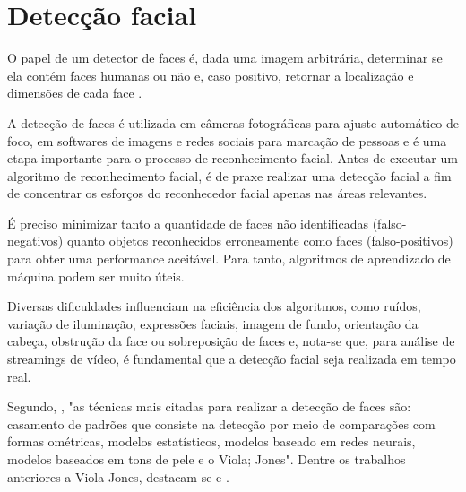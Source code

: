 \chapter{Detecção facial}

O papel de um detector de faces é, dada uma imagem arbitrária, determinar se ela contém faces humanas ou não e, caso positivo, retornar a localização e dimensões de cada face \cite{censtudy}.

A detecção de faces é utilizada em câmeras fotográficas para ajuste automático de foco, em softwares de imagens e redes sociais para marcação de pessoas e é uma etapa importante para o processo de reconhecimento facial. Antes de executar um algoritmo de reconhecimento facial, é de praxe realizar uma detecção facial a fim de concentrar os esforços do reconhecedor facial apenas nas áreas relevantes.

É preciso minimizar tanto a quantidade de faces não identificadas (falso-negativos) quanto objetos reconhecidos erroneamente como faces (falso-positivos) para obter uma performance aceitável. Para tanto, algoritmos de aprendizado de máquina podem ser muito úteis.

Diversas dificuldades influenciam na eficiência dos algoritmos, como ruídos, variação de iluminação, expressões faciais, imagem de fundo, orientação da cabeça, obstrução da face ou sobreposição de faces \cite{de2015processo} e, nota-se que, para análise de streamings de vídeo, é fundamental que a detecção facial seja realizada em tempo real.

Segundo, \citet{de2015processo}, "as técnicas mais citadas para realizar a detecção de faces são: casamento de padrões que consiste na detecção por meio de comparações com formas ométricas, modelos estatísticos, modelos baseado em redes neurais, modelos baseados em tons de pele e o Viola; Jones". Dentre os trabalhos anteriores a Viola-Jones, destacam-se \citet{rowley1998neural} e \citet{schneiderman2000statistical}.